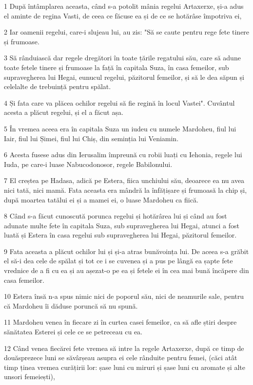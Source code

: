 \par 1 După întâmplarea aceasta, când s-a potolit mânia regelui Artaxerxe, și-a adus el aminte de regina Vasti, de ceea ce făcuse ea și de ce se hotărâse împotriva ei,
\par 2 Iar oamenii regelui, care-i slujeau lui, au zis: "Să se caute pentru rege fete tinere și frumoase.
\par 3 Să rânduiască dar regele dregători în toate țările regatului său, care să adune toate fetele tinere și frumoase la față în capitala Suza, în casa femeilor, sub supravegherea lui Hegai, eunucul regelui, păzitorul femeilor, și să le dea săpun și celelalte de trebuință pentru spălat.
\par 4 Și fata care va plăcea ochilor regelui să fie regină în locul Vastei". Cuvântul acesta a plăcut regelui, și el a făcut așa.
\par 5 În vremea aceea era în capitala Suza un iudeu cu numele Mardoheu, fiul lui Iair, fiul lui Șimei, fiul lui Chiș, din seminția lui Veniamin.
\par 6 Acesta fusese adus din Ierusalim împreună cu robii luați cu Iehonia, regele lui Iuda, pe care-i luase Nabucodonosor, regele Babilonului.
\par 7 El creștea pe Hadasa, adică pe Estera, fiica unchiului său, deoarece ea nu avea nici tată, nici mamă. Fata aceasta era mândră la înfățișare și frumoasă la chip și, după moartea tatălui ei și a mamei ei, o luase Mardoheu ca fiică.
\par 8 Când s-a făcut cunoscută porunca regelui și hotărârea lui și când au fost adunate multe fete în capitala Suza, sub supravegherea lui Hegai, atunci a fost luată și Estera în casa regelui sub supravegherea lui Hegai, păzitorul femeilor.
\par 9 Fata aceasta a plăcut ochilor lui și și-a atras bunăvoința lui. De aceea s-a grăbit el să-i dea cele de spălat și tot ce i se cuvenea și a pus pe lângă ea șapte fete vrednice de a fi cu ea și au așezat-o pe ea și fetele ei în cea mai bună încăpere din casa femeilor.
\par 10 Estera însă n-a spus nimic nici de poporul său, nici de neamurile sale, pentru că Mardoheu îi dăduse poruncă să nu spună.
\par 11 Mardoheu venea în fiecare zi în curtea casei femeilor, ca să afle știri despre sănătatea Esterei și cele ce se petreceau cu ea.
\par 12 Când venea fiecărei fete vremea să intre la regele Artaxerxe, după ce timp de douăsprezece luni se săvârșeau asupra ei cele rânduite pentru femei, (căci atât timp ținea vremea curățirii lor: șase luni cu miruri și șase luni cu aromate și alte unsori femeiești),
